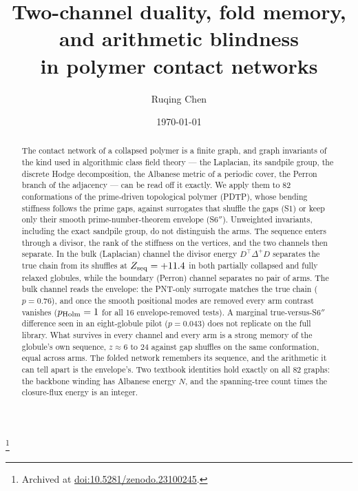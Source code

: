 \documentclass[reprint,amsmath,amssymb,aps,pre,longbibliography]{revtex4-2}
\begin{document}
\title{Two-channel duality, fold memory, and arithmetic blindness\\
in polymer contact networks}

\author{Ruqing Chen}
\thanks{Archived at \href{https://doi.org/10.5281/zenodo.23100245}{doi:10.5281/zenodo.23100245}.}
\date{\today}

\begin{abstract}
The contact network of a collapsed polymer is a finite graph, and graph invariants of the kind
used in algorithmic class field theory --- the Laplacian, its sandpile group, the discrete Hodge
decomposition, the Albanese metric of a periodic cover, the Perron branch of the adjacency ---
can be read off it exactly. We apply them to 82 conformations of the prime-driven topological
polymer (PDTP), whose bending stiffness follows the prime gaps, against surrogates that shuffle the
gaps (S1) or keep only their smooth prime-number-theorem envelope (S6$''$). Unweighted invariants,
including the exact sandpile group, do not distinguish the arms. The sequence enters through a
divisor, the rank of the stiffness on the vertices, and the two channels then separate. In the
bulk (Laplacian) channel the divisor energy $D^{\top}\Delta^{+}D$ separates the true chain from
its shuffles at $Z_{\rm seq}=+11.4$ in both partially collapsed and fully relaxed globules, while
the boundary (Perron) channel separates no pair of arms. The bulk channel reads the envelope: the
PNT-only surrogate matches the true chain ($p=0.76$), and once the smooth positional modes are
removed every arm contrast vanishes ($p_{\rm Holm}=1$ for all 16 envelope-removed tests). A
marginal true-versus-S6$''$ difference seen in an eight-globule pilot ($p=0.043$) does not
replicate on the full library. What survives in every channel and every arm is a strong memory of
the globule's own sequence, $z\approx6$ to $24$ against gap shuffles on the same conformation,
equal across arms. The folded network remembers its sequence, and the arithmetic it can tell apart
is the envelope's. Two textbook identities hold exactly on all 82 graphs: the backbone winding has
Albanese energy $N$, and the spanning-tree count times the closure-flux energy is an integer.
\end{abstract}

\maketitle
\end{document}

